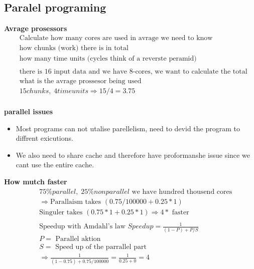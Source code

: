 \documentclass{article}
\begin{document}
\subsection{Paralel programing}


\textbf{Avrage prosessors}
\begin{align*}
  &\quad  \text{Calculate how many cores are used in avrage we need to know } \\
  &\quad  \text{how chunks (work) there is in total } \\
  &\quad  \text{how many time units (cycles think of a reverste peramid)} \\
  &\quad  \\
  &\quad  \text{there is 16 input data and we have 8-cores, we want to calculate the total sum} \\
  &\quad  \text{what is the avrage prossesor being used} \\
  &\quad  15 chunks, \; 4 time units \Rightarrow 15/4 = 3.75 \\
\end{align*}

\textbf{parallel issues}
\begin{itemize}
\item  Most programs can not utalise parellelism, need to devid the program to diffrent exicutions.
\item  We also need to share cache and therefore have proformanshe issue since we cant use the entire cache.
\end{itemize}


\textbf{How mutch faster}
\begin{align*}
  &\quad  75\% parallel, \; 25\% non parallel \text{ we have hundred thousend cores } \\
  &\quad  \Rightarrow  \text{Parallaism takes } (0.75/100000 + 0.25*1) \\
  &\quad  \text{Singuler takes } (0.75*1 + 0.25*1)  \Rightarrow 4* \text{ faster} \\
  &\quad  \\
  &\quad  \text{Speedup with Amdahl's law } Speedup=\frac{1}{(1-P)+P/S} \\
  &\quad  P= \text{ Parallel aktion} \\
  &\quad  S= \text{ Speed up of the parrallel part} \\
  &\quad  \Rightarrow \frac{1}{(1-0.75)+0.75/100000} = \frac{1}{0.25+0}= 4 \\
\end{align*}
\end{document}
